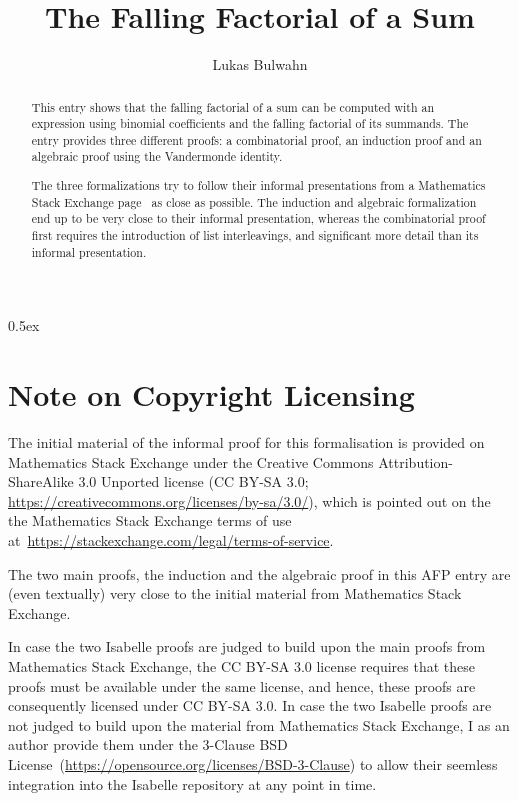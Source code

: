\documentclass[11pt,a4paper]{article}
\begin{document}
\title{The Falling Factorial of a Sum}
\author{Lukas Bulwahn}
\maketitle

\begin{abstract}

This entry shows that the falling factorial of a sum can be computed with an expression
using binomial coefficients and the falling factorial of its summands. The entry provides
three different proofs: a combinatorial proof, an induction proof and an algebraic proof
using the Vandermonde identity.

The three formalizations try to follow their informal presentations from a Mathematics Stack
Exchange page~\cite{mse-1, mse-2, mse-3, mse-4} as close as possible. The induction and
algebraic formalization end up to be very close to their informal presentation, whereas the
combinatorial proof first requires the introduction of list interleavings, and significant
more detail than its informal presentation.

\end{abstract}

\tableofcontents

\parindent 0pt\parskip 0.5ex



\section{Note on Copyright Licensing}

The initial material of the informal proof for this formalisation is provided
on Mathematics Stack Exchange under the Creative Commons Attribution-ShareAlike
3.0 Unported license (CC BY-SA 3.0; \url{https://creativecommons.org/licenses/by-sa/3.0/}),
which is pointed out on the the Mathematics Stack Exchange terms of use
at~\url{https://stackexchange.com/legal/terms-of-service}.

The two main proofs, the induction and the algebraic proof in this AFP entry
are (even textually) very close to the initial material from Mathematics Stack Exchange.

In case the two Isabelle proofs are judged to build upon the main proofs from
Mathematics Stack Exchange, the CC BY-SA 3.0 license requires that these proofs
must be available under the same license, and hence, these proofs are consequently
licensed under CC BY-SA 3.0. In case the two Isabelle proofs are not judged to build
upon the material from Mathematics Stack Exchange, I as an author provide them under
the 3-Clause BSD License~(\url{https://opensource.org/licenses/BSD-3-Clause}) to
allow their seemless integration into the Isabelle repository at any point in time.
\end{document}
